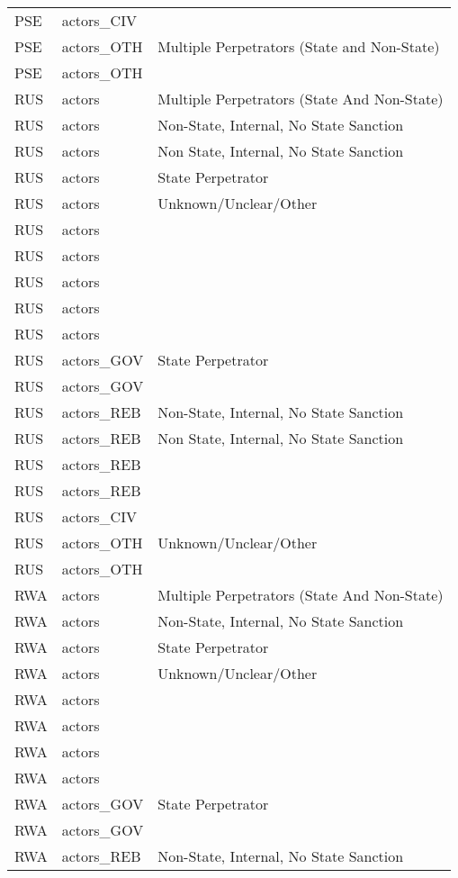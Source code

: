\begin{table}[ht]
\begin{tabular}{lll}
  PSE & actors\_CIV &  \\ 
  PSE & actors\_OTH & Multiple Perpetrators (State and Non-State) \\ 
  PSE & actors\_OTH &  \\ 
  RUS & actors & Multiple Perpetrators (State And Non-State) \\ 
  RUS & actors & Non-State, Internal, No State Sanction \\ 
  RUS & actors & Non State, Internal, No State Sanction \\ 
  RUS & actors & State Perpetrator \\ 
  RUS & actors & Unknown/Unclear/Other \\ 
  RUS & actors &  \\ 
  RUS & actors &  \\ 
  RUS & actors &  \\ 
  RUS & actors &  \\ 
  RUS & actors &  \\ 
  RUS & actors\_GOV & State Perpetrator \\ 
  RUS & actors\_GOV &  \\ 
  RUS & actors\_REB & Non-State, Internal, No State Sanction \\ 
  RUS & actors\_REB & Non State, Internal, No State Sanction \\ 
  RUS & actors\_REB &  \\ 
  RUS & actors\_REB &  \\ 
  RUS & actors\_CIV &  \\ 
  RUS & actors\_OTH & Unknown/Unclear/Other \\ 
  RUS & actors\_OTH &  \\ 
  RWA & actors & Multiple Perpetrators (State And Non-State) \\ 
  RWA & actors & Non-State, Internal, No State Sanction \\ 
  RWA & actors & State Perpetrator \\ 
  RWA & actors & Unknown/Unclear/Other \\ 
  RWA & actors &  \\ 
  RWA & actors &  \\ 
  RWA & actors &  \\ 
  RWA & actors &  \\ 
  RWA & actors\_GOV & State Perpetrator \\ 
  RWA & actors\_GOV &  \\ 
  RWA & actors\_REB & Non-State, Internal, No State Sanction \\ 

\end{tabular}
\end{table}
